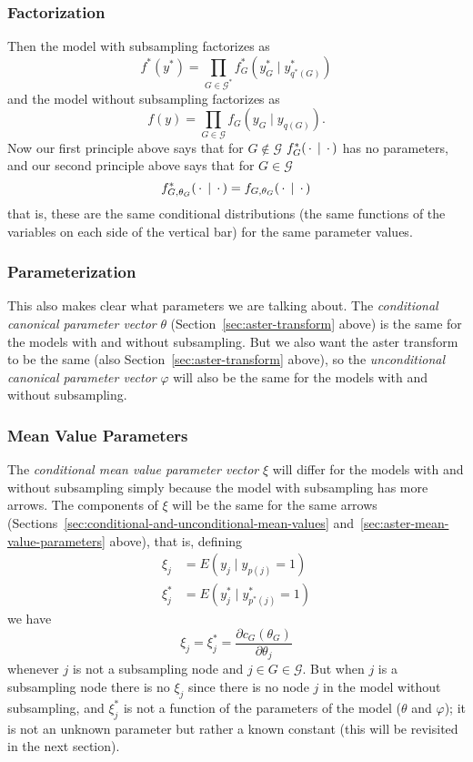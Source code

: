 \subsubsection{Factorization}

Then the model with subsampling factorizes as
\begin{equation} \label{eq:factorization-with}
   f^*(y^*) = \prod_{G \in \mathcal{G}^*} f^*_G(y^*_G \mid y^*_{q^*(G)})
\end{equation}
and the model without subsampling factorizes as
\begin{equation} \label{eq:factorization-without}
   f(y) = \prod_{G \in \mathcal{G}} f_G(y_G \mid y_{q(G)}).
\end{equation}
Now our first principle above says that for $G \notin \mathcal{G}$
$f^*_G(\,\cdot\, \mid \,\cdot\,)$ has no parameters,
and our second principle above says that for $G \in \mathcal{G}$
$$
   f^*_{G, \theta_G}(\,\cdot\, \mid \,\cdot\,)
   =
   f_{G, \theta_G}(\,\cdot\, \mid \,\cdot\,)
$$
that is, these are the same conditional distributions (the same functions
of the variables on each side of the vertical bar) for the same parameter
values.

\subsubsection{Parameterization}

This also makes clear what parameters we are talking about.
The \emph{conditional canonical parameter vector} $\theta$
(Section~\ref{sec:aster-transform} above)
is the same for the models with and without subsampling.
But we also want the aster transform to be the same
(also Section~\ref{sec:aster-transform} above), so
the \emph{unconditional canonical parameter vector} $\varphi$ will also be
the same for the models with and without subsampling.

\subsubsection{Mean Value Parameters}

The \emph{conditional mean value parameter vector} $\xi$ will differ
for the models with and without subsampling simply because the model
with subsampling has more arrows.  The components of $\xi$ will be the
same for the same arrows
(Sections~\ref{sec:conditional-and-unconditional-mean-values}
and~\ref{sec:aster-mean-value-parameters} above), that is, defining
\begin{align*}
   \xi_j & = E(y_j \mid y_{p(j)} = 1)
   \\
   \xi^*_j & = E(y_j^* \mid y^*_{p^*(j)} = 1)
\end{align*}
we have
$$
   \xi_j = \xi^*_j = \frac{\partial c_G(\theta_G)}{\partial \theta_j}
$$
whenever $j$ is not a subsampling node and $j \in G \in \mathcal{G}$.
But when $j$ is a subsampling node there is no $\xi_j$ since there is
no node $j$ in the model without subsampling, and $\xi^*_j$ is not a function
of the parameters of the model ($\theta$ and $\varphi$); it is not an unknown
parameter but rather a known constant (this will be revisited in the
next section).


